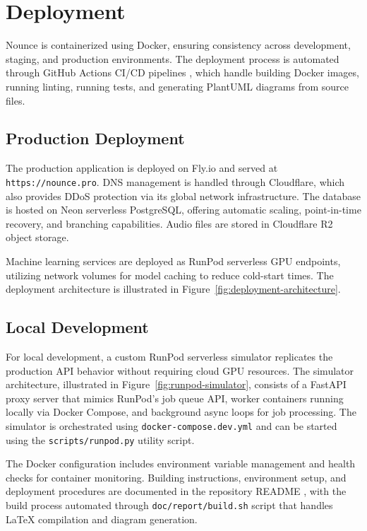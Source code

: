 \documentclass[a4paper,12pt]{report}
\begin{document}
\section{Deployment}

Nounce is containerized using Docker, ensuring consistency across development, staging, and production environments. The deployment process is automated through GitHub Actions CI/CD pipelines \cite{github2024actions}, which handle building Docker images, running linting, running tests, and generating PlantUML diagrams from source files.

\subsection{Production Deployment}

The production application is deployed on Fly.io and served at \texttt{https://nounce.pro}. DNS management is handled through Cloudflare, which also provides DDoS protection via its global network infrastructure. The database is hosted on Neon serverless PostgreSQL, offering automatic scaling, point-in-time recovery, and branching capabilities. Audio files are stored in Cloudflare R2 object storage.

Machine learning services are deployed as RunPod serverless GPU endpoints, utilizing network volumes for model caching to reduce cold-start times. The deployment architecture is illustrated in Figure~\ref{fig:deployment-architecture}.

\subsection{Local Development}

For local development, a custom RunPod serverless simulator replicates the production API behavior without requiring cloud GPU resources. The simulator architecture, illustrated in Figure~\ref{fig:runpod-simulator}, consists of a FastAPI proxy server that mimics RunPod's job queue API, worker containers running locally via Docker Compose, and background async loops for job processing. The simulator is orchestrated using \texttt{docker-compose.dev.yml} and can be started using the \texttt{scripts/runpod.py} utility script.

The Docker configuration includes environment variable management and health checks for container monitoring. Building instructions, environment setup, and deployment procedures are documented in the repository README \cite{github2024readme}, with the build process automated through \texttt{doc/report/build.sh} script that handles LaTeX compilation and diagram generation.
\end{document}
